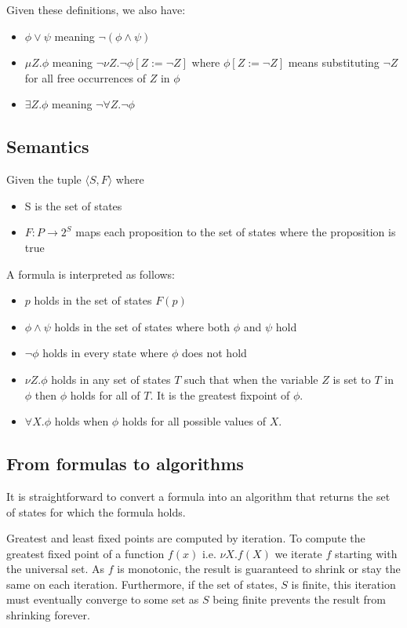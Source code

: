 \noindent Given these definitions, we also have:
\begin{itemize}
    \item $\phi \vee \psi$ meaning $\neg (\phi \wedge \psi)$
    \item $\mu Z. \phi$ meaning $\neg \nu Z. \neg \phi [Z := \neg Z]$ where $\phi[Z := \neg Z]$ means substituting $\neg Z$ for all free occurrences of $Z$ in $\phi$
    \item $\exists Z. \phi$ meaning $\neg \forall Z. \neg \phi$
\end{itemize}

\subsection{Semantics}

Given the tuple $\langle S, F \rangle$ where
\begin{itemize}
    \item S is the set of states
    \item $F : P \rightarrow 2^S$ maps each proposition to the set of states where the proposition is true
\end{itemize}

\noindent A \mucalc formula is interpreted as follows:
\begin{itemize}
    \item $p$ holds in the set of states $F(p)$
    \item $\phi \wedge \psi$ holds in the set of states where both $\phi$ and $\psi$ hold
    \item $\neg \phi$ holds in every state where $\phi$ does not hold 
    \item $\nu Z. \phi$ holds in any set of states $T$ such that when the variable $Z$ is set to $T$ in $\phi$ then $\phi$ holds for all of $T$. It is the greatest fixpoint of $\phi$.
    \item $\forall X. \phi$ holds when $\phi$ holds for all possible values of $X$.
\end{itemize}

\subsection{From \mucalc formulas to algorithms}

It is straightforward to convert a \mucalc formula into an algorithm that returns the set of states for which the formula holds.

Greatest and least fixed points are computed by iteration. To compute the greatest fixed point of a function $f(x)$ i.e. $\nu X. f(X)$ we iterate $f$ starting with the universal set. As $f$ is monotonic, the result is guaranteed to shrink or stay the same on each iteration. Furthermore, if the set of states, $S$ is finite, this iteration must eventually converge to some set as $S$ being finite prevents the result from shrinking forever. 

